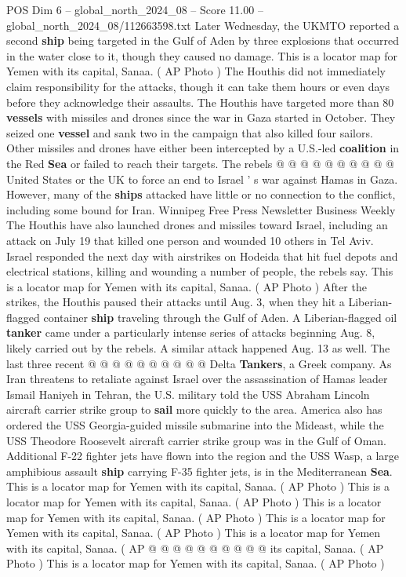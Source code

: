 \begin{textsample}{POS Dim 6 – global\_north\_2024\_08 – Score 11.00 – global\_north\_2024\_08/112663598.txt}
Later Wednesday, the UKMTO reported a second \textbf{ship} being targeted in the Gulf of Aden by three explosions that occurred in the water close to it, though they caused no damage.
This is a locator map for Yemen with its capital, Sanaa. ( AP Photo ) The Houthis did not immediately claim responsibility for the attacks, though it can take them hours or even days before they acknowledge their assaults.
The Houthis have targeted more than 80 \textbf{vessels} with missiles and drones since the war in Gaza started in October.
They seized one \textbf{vessel} and sank two in the campaign that also killed four sailors.
Other missiles and drones have either been intercepted by a U.S.-led \textbf{coalition} in the Red \textbf{Sea} or failed to reach their targets.
The rebels @ @ @ @ @ @ @ @ @ @ United States or the UK to force an end to Israel ' s war against Hamas in Gaza.
However, many of the \textbf{ships} attacked have little or no connection to the conflict, including some bound for Iran.
Winnipeg Free Press Newsletter Business Weekly The Houthis have also launched drones and missiles toward Israel, including an attack on July 19 that killed one person and wounded 10 others in Tel Aviv.
Israel responded the next day with airstrikes on Hodeida that hit fuel depots and electrical stations, killing and wounding a number of people, the rebels say.
This is a locator map for Yemen with its capital, Sanaa. ( AP Photo ) After the strikes, the Houthis paused their attacks until Aug. 3, when they hit a Liberian-flagged container \textbf{ship} traveling through the Gulf of Aden.
A Liberian-flagged oil \textbf{tanker} came under a particularly intense series of attacks beginning Aug. 8, likely carried out by the rebels.
A similar attack happened Aug. 13 as well.
The last three recent @ @ @ @ @ @ @ @ @ @ Delta \textbf{Tankers}, a Greek company.
As Iran threatens to retaliate against Israel over the assassination of Hamas leader Ismail Haniyeh in Tehran, the U.S. military told the USS Abraham Lincoln aircraft carrier strike group to \textbf{sail} more quickly to the area.
America also has ordered the USS Georgia-guided missile submarine into the Mideast, while the USS Theodore Roosevelt aircraft carrier strike group was in the Gulf of Oman.
Additional F-22 fighter jets have flown into the region and the USS Wasp, a large amphibious assault \textbf{ship} carrying F-35 fighter jets, is in the Mediterranean \textbf{Sea}.
This is a locator map for Yemen with its capital, Sanaa. ( AP Photo ) This is a locator map for Yemen with its capital, Sanaa. ( AP Photo ) This is a locator map for Yemen with its capital, Sanaa. ( AP Photo ) This is a locator map for Yemen with its capital, Sanaa. ( AP Photo ) This is a locator map for Yemen with its capital, Sanaa. ( AP @ @ @ @ @ @ @ @ @ @ its capital, Sanaa. ( AP Photo ) This is a locator map for Yemen with its capital, Sanaa. ( AP Photo )

\end{textsample}
